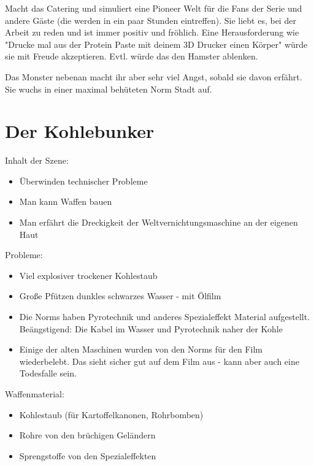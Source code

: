 \begin{npcBox}[title=Cherie]
    \begin{npcDescription}
    Macht das Catering und simuliert eine Pioneer Welt für die Fans der Serie und andere Gäste (die werden in ein paar Stunden eintreffen).
    Sie liebt es, bei der Arbeit zu reden und ist immer positiv und fröhlich. Eine Herausforderung wie "Drucke mal aus der Protein Paste mit deinem 3D Drucker einen Körper" würde sie mit Freude akzeptieren. Evtl. würde das den Hamster ablenken.

    Das Monster nebenan macht ihr aber sehr viel Angst, sobald sie davon erfährt. Sie wuchs in einer maximal behüteten Norm Stadt auf.

    \end{npcDescription}

\end{npcBox}



\section{Der Kohlebunker}

Inhalt der Szene:
\begin{itemize}
\item Überwinden technischer Probleme
\item Man kann Waffen bauen
\item Man erfährt die Dreckigkeit der Weltvernichtungsmaschine an der eigenen Haut
\end{itemize}

Probleme:

\begin{itemize}
\item Viel explosiver trockener Kohlestaub
\item Große Pfützen dunkles schwarzes Wasser - mit Ölfilm
\item Die Norms haben Pyrotechnik und anderes Spezialeffekt Material aufgestellt. Beängstigend: Die Kabel im Wasser und Pyrotechnik naher der Kohle
\item Einige der alten Maschinen wurden von den Norms für den Film wiederbelebt. Das sieht sicher gut auf dem Film aus - kann aber auch eine Todesfalle sein.
\end{itemize}

Waffenmaterial:

\begin{itemize}
\item Kohlestaub (für Kartoffelkanonen, Rohrbomben)
\item Rohre von den brüchigen Geländern
\item Sprengstoffe von den Spezialeffekten
\end{itemize}


